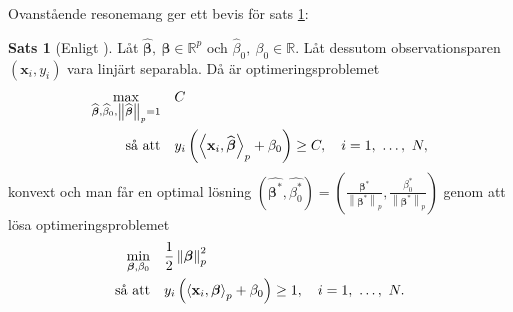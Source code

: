 \documentclass[a4paper, 12pt]{report}
\theoremstyle{definition}
\newtheorem{thm}{Sats}[section]
\newtheorem{cor}[thm]{Korollarium}
\theoremstyle{remark}
\newcommand{\bfbeta}{{\boldsymbol{\beta}}}
\newcommand{\bfx}{\mathbf{x}}
\newcommand{\llangle}{\left\langle}
\newcommand{\rrangle}{\right\rangle}
\newcommand{\inner}[2]{\llangle #1, #2 \rrangle}
\begin{document}
Ovanstående resonemang ger ett bevis för sats \ref{thm:primallinearproblem}:
\begin{thm}[Enligt \cite{ESL}]\label{thm:primallinearproblem}
	Låt $\widehat{\bfbeta},~\bfbeta \in \mathbb{R}^p$ och $\widehat{\beta}_0,~\beta_0 \in \mathbb{R}$. Låt dessutom observationsparen $\left(\mathbf{x}_i, y_i\right)$ vara linjärt separabla. Då är optimeringsproblemet
	\begin{equation*}
	\begin{aligned}
	\operatornamewithlimits{max}_{\widehat{\bfbeta}, \widehat{\beta}_0, \left\|\widehat{\bfbeta}
\right\|_p=1} & & &C\\
	\text{så att} & & &y_i\left(\inner{\bfx_i}{\widehat{\bfbeta}}_p+\beta_0\right)\geq C,\quad i=1,~\dots,~N,
	\end{aligned}
	\end{equation*}
	konvext och man får en optimal lösning $\left(\widehat{\bfbeta^*}, \widehat{\beta_0^*}\right)=\left(\frac{\bfbeta^*}{\left\|\bfbeta^*\right\|_p}, \frac{\beta^*_0}{\left\|\bfbeta^*\right\|_p}\right)$ genom att lösa optimeringsproblemet
	\begin{equation*}
	\begin{aligned}
	\operatornamewithlimits{min}_{\bfbeta, \beta_0} & & &\frac{1}{2}\left\|\bfbeta
\right\|_p^2\\
	\text{så att} & & &y_i\left(\inner{\bfx_i}{\bfbeta}_p+\beta_0\right)\geq 1,\quad i=1,~\dots,~N.
	\end{aligned}
	\end{equation*}
\end{thm}
\end{document}
